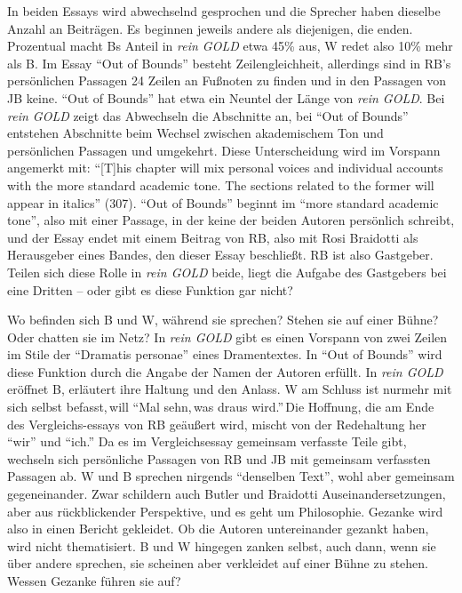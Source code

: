 \documentclass[fontsize=12pt]{scrartcl}
\begin{document}
In beiden Essays wird abwechselnd gesprochen und die Sprecher\textsuperscript{\tiny *} haben dieselbe Anzahl an Beitr\"agen. Es beginnen jeweils andere als diejenigen, die enden. Prozentual macht Bs Anteil in \textit{rein GOLD} etwa 45\% aus, W redet also 10\% mehr als B. Im Essay "`Out of Bounds"' be\-steht Zeilengleichheit, al\-ler\-dings sind in RB's pers\"onlichen Passagen 24 Zeilen an Fu{\ss}noten zu finden und in den Passagen von JB keine. "`Out of Bounds"' hat etwa ein Neuntel der L\"ange von \textit{rein GOLD}. Bei \textit{rein GOLD} zeigt das Abwechseln die Abschnitte an, bei "`Out of Bounds"' entstehen Abschnitte beim Wechsel zwischen akademischem Ton und pers\"onlichen Passagen und umgekehrt. Diese Unterscheidung wird im Vorspann angemerkt mit: "`[T]his chapter will mix personal voices and individual accounts with the more standard academic tone. The sections related to the former will appear in italics"' (307). "`Out of Bounds"' beginnt im "`more standard academic tone"', also mit einer Passage, in der keine der beiden Autoren\textsuperscript{\tiny *} pers\"onlich schreibt, und der Essay endet mit einem Beitrag von RB, also mit Rosi Braidotti als He\-rausgeber\textsuperscript{\tiny *} eines Bandes, den dieser Essay beschlie{\ss}t. RB ist also Gastgeber\textsuperscript{\tiny *}. Teilen sich diese Rolle in \textit{rein GOLD} beide, liegt die Aufgabe des Gastgebers\textsuperscript{\tiny *} bei eine\textsuperscript{\tiny *} Dritten -- oder gibt es diese Funktion gar nicht? 

Wo befinden sich B und W, w\"ahrend sie sprechen? Stehen sie auf einer B\"uhne? Oder chatten sie im Netz? In \textit{rein GOLD} gibt es einen Vorspann von zwei Zeilen im Stile der "`Dramatis personae"' eines Dramentextes. In "`Out of Bounds"' wird diese Funktion durch die Angabe der Namen der Autoren\textsuperscript{\tiny *} erf\"ullt. In \textit{rein GOLD} er\"offnet B, erl\"autert ihre Haltung und den Anlass. W am Schluss ist nurmehr mit sich \mbox{selbst} befasst,\,will "`Mal sehn,\,was draus wird."'\,Die Hoffnung, die am Ende des Vergleichs­-essays von RB ge\"au{\ss}ert wird, mischt von der Redehaltung her "`wir"' und "`ich."' Da es im Vergleichsessay gemeinsam verfasste Teile gibt, wechseln sich pers\"onliche Passagen von RB und JB mit gemeinsam verfassten Passagen ab. W und B sprechen nirgends "`denselben Text"', wohl aber gemeinsam gegeneinander. Zwar schildern auch Butler und Braidotti Auseinandersetzungen, aber aus r\"uckblickender Perspektive, und es geht um Philosophie. Gezanke wird also in einen Bericht gekleidet. Ob die Autoren\textsuperscript{\tiny *} untereinander gezankt haben, wird nicht thematisiert. B und W hingegen zanken \mbox{selbst}, auch dann, wenn sie \"uber andere sprechen, sie scheinen aber verkleidet auf einer B\"uhne zu stehen. Wessen Gezanke f\"uhren sie auf?
\end{document}
